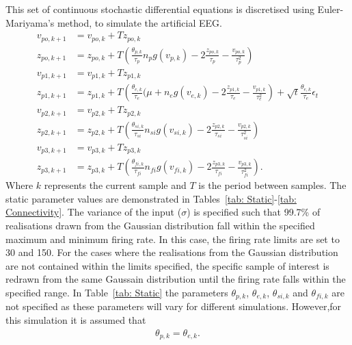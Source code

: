 This set of continuous stochastic differential equations is discretised using Euler-Mariyama's method, to simulate the artificial EEG. \begin{align}
v_{po,k+1}&=v_{po,k}+Tz_{po,k}\\
z_{po,k+1}&=z_{po,k}+T\left(\frac{\theta_{p,k}}{\tau_{p}}n_{p}g(v_{p,k})-2\frac{z_{po,k}}{\tau_{p}}-\frac{v_{po,k}}{\tau_{p}^{2}}\right)\\
v_{p1,k+1}&=v_{p1,k}+Tz_{p1,k}\\
z_{p1,k+1}&=z_{p1,k}+T\left(\frac{\theta_{e,k}}{\tau_{e}}(\mu +n_{e}g(v_{e,k})-2\frac{z_{p1,k}}{\tau_{e}}-\frac{v_{p1,k}}{\tau_{e}^{2}}\right) + \sqrt{t}\frac{\theta_{e,k}}{\tau_{e}}\epsilon_{t}\\
v_{p2,k+1}&=v_{p2,k}+Tz_{p2,k}\\
z_{p2,k+1}&=z_{p2,k}+T\left(\frac{\theta_{si,k}}{\tau_{si}}n_{si}g(v_{si,k})-2\frac{z_{p2,k}}{\tau_{si}}-\frac{v_{p2,k}}{\tau_{si}^{2}}\right)\\
v_{p3,k+1}&=v_{p3,k}+Tz_{p3,k}\\
z_{p3,k+1}&=z_{p3,k}+T\left(\frac{\theta_{fi,k}}{\tau_{fi}}n_{fi}g(v_{fi,k})-2\frac{z_{p3,k}}{\tau_{fi}}-\frac{v_{p3,k}}{\tau_{fi}^{2}}\right).
\end{align} Where $k$ represents the current sample and $T$ is the period between samples. The static parameter values are demonstrated in  Tables~\ref{tab: Static}-\ref{tab: Connectivity}. The variance of the input ($\sigma$) is specified such that 99.7\% of realisations drawn from the Gaussian distribution fall within the specified maximum and minimum firing rate. In this case, the firing rate limits are set to 30 and 150. For the cases where the realisations from the Gaussian distribution are not contained within the limits specified, the specific sample of interest is redrawn from the same Gaussain distribution until the firing rate falls within the specified range. In Table~\ref{tab: Static} the parameters $\theta_{p,k}$, $\theta_{e,k}$, $\theta_{si,k}$ and $\theta_{fi,k}$ are not specified as these parameters will vary for different simulations. However,for this simulation it is assumed that \begin{align}
\theta_{p,k} = \theta_{e,k}.
\end{align}
\singlespacing
\small

